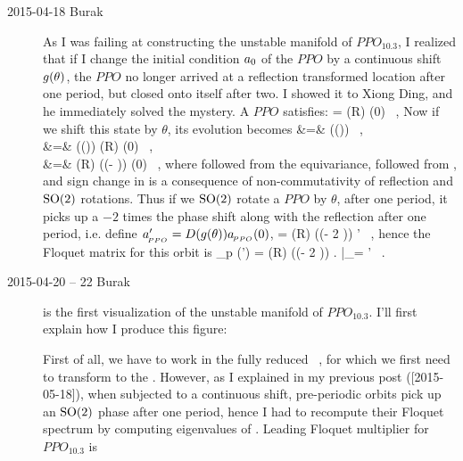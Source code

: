 \begin{description}
\item[2015-04-18 Burak] As I was failing at constructing the unstable
manifold of $PPO_{10.3}$, I realized that if I change the initial
condition $a_{0}$ of the $PPO$ by a continuous shift
$g (\theta)$, the $PPO$ no longer arrived at a
reflection transformed location after one period, but closed onto
itself after two. I showed it to Xiong Ding, and he immediately
solved the mystery. A $PPO$ satisfies:
\beq
     = \matrixRep (R) \sspPPO (0)   \, ,
    \label{e-PPOevolve}
\eeq
Now if we shift this state by $\theta$, its evolution becomes
\bea
     &=&
        \matrixRep(\LieEl(\theta))  \, ,
            \label{e-shiftPPOeqv} \\ &=&
        \matrixRep(\LieEl(\theta)) \matrixRep (R) \sspPPO (0) \, ,
            \label{e-shiftPPOevolve} \\ &=&
        \matrixRep (R) \matrixRep(\LieEl(- \theta)) \sspPPO (0) \, ,
            \label{e-shiftPPOnoncommute}
\eea
where  followed from the equivariance,
 followed from , and
sign change in  is a consequence of
non-commutativity of reflection and $\textrm{SO}(2)$ rotations. Thus if we
$\textrm{SO}(2)$ rotate a $PPO$ by $\theta$, after one period, it picks up
a $-2$ times the phase shift along with the reflection after one
period, i.e. define
$a_{\!_{PPO}}' = {D} (g (\theta ) ) a_{\!_{PPO}}(0)$,
\beq
     =
        \matrixRep (R) \matrixRep(\LieEl(- 2 \theta)) \sspPPO' \, ,
       \label{e-rotateppo}
\eeq
hence the Floquet matrix for this orbit is
\beq
    \jMps_p (\sspPPO') = \matrixRep (R) \matrixRep(\LieEl(- 2 \theta))
                         \left.
                         \right|_{\ssp = \sspPPO'} \, .
   \label{e-JPPOshift}
\eeq

\item[2015-04-20 -- 22 Burak]  is the first visualization of
the unstable manifold of $PPO_{10.3}$. I'll first explain how I produce this
figure:

First of all, we have to work in the fully reduced \statesp\ ,
for which we first need to transform to the \fFslice . However, as I explained
in my previous post ([2015-05-18]), when subjected to a continuous shift,
pre-periodic orbits pick up an $\textrm{SO}(2)$ phase after one period, hence I had
to recompute their Floquet spectrum by computing eigenvalues of
. Leading Floquet multiplier for $PPO_{10.3}$ is


\end{description}
